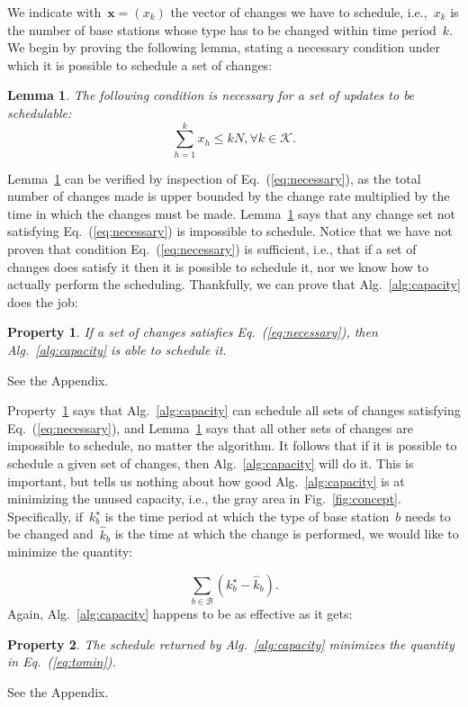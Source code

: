 \documentclass[10pt,journal,cspaper,compsoc]{IEEEtran}
\newcommand{\Fig}[1]{Fig.~\ref{fig:#1}}
\newcommand{\Eq}[1]{Eq.~(\ref{eq:#1})}
\newcommand{\Alg}[1]{Alg.~\ref{alg:#1}}
\newcommand{\Lemma}[1]{Lemma~\ref{lem:#1}}
\newtheorem{property}{Property}
\newtheorem{lemma}{Lemma}
\newcommand{\Prop}[1]{Property~\ref{prop:#1}}
\newcommand{\Bc}{\mathcal{B}}
\newcommand{\Kc}{\mathcal{K}}
\begin{document}
We indicate with~$\mathbf{x}=(x_k)$ the vector of changes we have to schedule, i.e.,~$x_k$ is the number of
base stations whose type has to be changed within time period~$k$.
We begin by proving the following lemma, stating a necessary condition
under which it is possible to schedule a set of changes:
\begin{lemma}
\label{lem:necessary}
The following condition is necessary for a set of updates to be schedulable:
\begin{equation}
\label{eq:necessary}
\sum_{h=1}^{k} x_h\leq kN,\forall k\in\Kc.
\end{equation}
\end{lemma}
\Lemma{necessary} can be verified by inspection of \Eq{necessary}, as the total number of changes made
is upper bounded by the change rate multiplied by the time in which the changes must be made.
\Lemma{necessary} says that any change set not satisfying \Eq{necessary} is impossible to schedule.
Notice that we have not proven that condition \Eq{necessary} is sufficient, i.e., that
if a set of changes does satisfy it then it is possible to schedule it, nor we know how to actually perform the scheduling.
Thankfully, we can prove that \Alg{capacity} does the job:
\begin{property}
\label{prop:feasible}
If a set of changes satisfies \Eq{necessary}, then \Alg{capacity} is able to schedule it.
\end{property}
\begin{IEEEproof}
See the Appendix.
\end{IEEEproof}

\Prop{feasible} says that \Alg{capacity} can schedule all sets of changes satisfying \Eq{necessary}, and \Lemma{necessary}
says that all other sets of changes are impossible to schedule, no matter the algorithm.
It follows that if it is possible to schedule a given set
of changes, then \Alg{capacity} will do it. This is important, but tells us nothing about how good \Alg{capacity} is at
minimizing the unused capacity, i.e., the gray area in \Fig{concept}. Specifically, if~$k^\star_b$ is the time period
at which the type of base station~$b$ needs to be changed and~$\hat{k}_b$ is the time at which the change is performed, we would
like to minimize the quantity:

\begin{equation}
\label{eq:tomin}
\sum_{b\in\Bc}\left( k^\star_b-\hat{k}_b \right ).
\end{equation}
Again, \Alg{capacity} happens to be as effective as it gets:
\begin{property}
\label{prop:optimal}
The schedule returned by \Alg{capacity} minimizes the quantity in \Eq{tomin}.
\end{property}
\begin{IEEEproof}
See the Appendix.
\end{IEEEproof}
\end{document}
